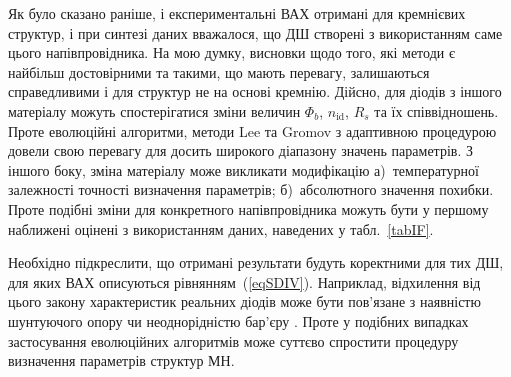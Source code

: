 Як було сказано раніше, і експериментальні ВАХ отримані для кремнієвих структур, і при синтезі даних вважалося, що ДШ створені з використанням саме цього напівпровідника.
На мою думку, висновки щодо того, які методи є найбільш достовірними та такими, що мають перевагу, залишаються справедливими і для структур не на основі кремнію.
Дійсно, для діодів з іншого матеріалу можуть спостерігатися зміни  величин $\Phi_b$, $n_\mathrm{id}$, $R_s$ та їх співвідношень.
Проте еволюційні алгоритми, методи Lee та Gromov з адаптивною процедурою довели свою перевагу для досить широкого діапазону значень параметрів.
З іншого боку, зміна матеріалу може викликати модифікацію
а)~температурної залежності точності визначення параметрів;
б)~абсолютного значення похибки.
Проте подібні зміни для конкретного напівпровідника можуть бути у першому наближені оцінені з використанням даних, наведених у табл.~\ref{tabIF}.

Необхідно підкреслити, що отримані результати будуть коректними для тих ДШ, для яких ВАХ описуються рівнянням~(\ref{eqSDIV}).
Наприклад, відхилення від цього закону характеристик реальних діодів може бути пов'язане з наявністю шунтуючого опору чи неоднорідністю бар'єру \cite{Tung:MSE,OlikhJAP}.
Проте у подібних випадках застосування еволюційних алгоритмів може суттєво спростити процедуру визначення параметрів структур МН.



